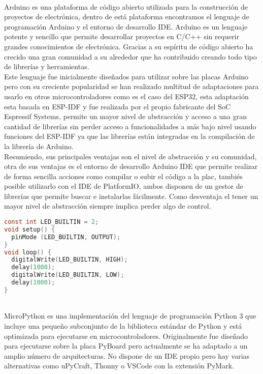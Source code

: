 \documentclass[../proyecto.tex]{subfiles}
\begin{document}
\\
Arduino es una plataforma de código abierto utilizada para la construcción de proyectos de electrónica, dentro de está plataforma encontramos el lenguaje de programación Arduino y el entorno de desarrollo IDE. Arduino es un lenguaje potente y sencillo que permite desarrollar proyectos en C/C++ sin requerir grandes conocimientos de electrónica. Gracias a su espíritu de código abierto ha crecido una gran comunidad a su alrededor que ha contribuido creando todo tipo de librerías y herramientas.\\

Este lenguaje fue inicialmente diseñados para utilizar sobre las placas Arduino pero con su creciente popularidad se han realizado multitud de adaptaciones para usarlo en otros microcontroladores como es el caso del ESP32, esta adaptación esta basada en ESP-IDF y fue realizada por el propio fabricante del SoC Espressif Systems, permite un mayor nivel de abstracción y acceso a una gran cantidad de librerías sin perder acceso a funcionalidades a más bajo nivel usando funciones del ESP-IDF ya que las librerías están integradas en la compilación de la librería de Arduino.\\

Resumiendo, sus principales ventajas son el nivel de abstracción y su comunidad, otra de sus ventajas es el entorno de desarrollo Arduino IDE que permite realizar de forma sencilla acciones como compilar o subir el código a la plac, tambiés posible utilizarlo con el IDE de PlatformIO, ambos disponen de un gestor de librerías que permite buscar e instalarlas fácilmente. Como desventaja el tener un mayor nivel de abstracción siempre implica perder algo de control.\\

\begin{minipage}{\linewidth}
\begin{lstlisting}[language=C, caption=Ejemplo de código para hacer parpadear un led con Arduino, captionpos=b, frame=single]
const int LED_BUILTIN = 2;
void setup() {
  pinMode (LED_BUILTIN, OUTPUT);
}
void loop() {
  digitalWrite(LED_BUILTIN, HIGH);
  delay(1000);
  digitalWrite(LED_BUILTIN, LOW);
  delay(1000);
}
\end{lstlisting}
\end{minipage}

\\
MicroPython es una implementación del lenguaje de programación Python 3 que incluye una pequeño subconjunto de la biblioteca estándar de Python y está optimizada para ejecutarse en microcontroladores. Originalmente fue diseñado para ejecutarse sobre la placa PyBoard pero actualmente se ha adaptado a un amplio número de arquitecturas. No dispone de un IDE propio pero hay varias alternativas como uPyCraft, Thonny o  VSCode con la extensión PyMark.\\
\end{document}
